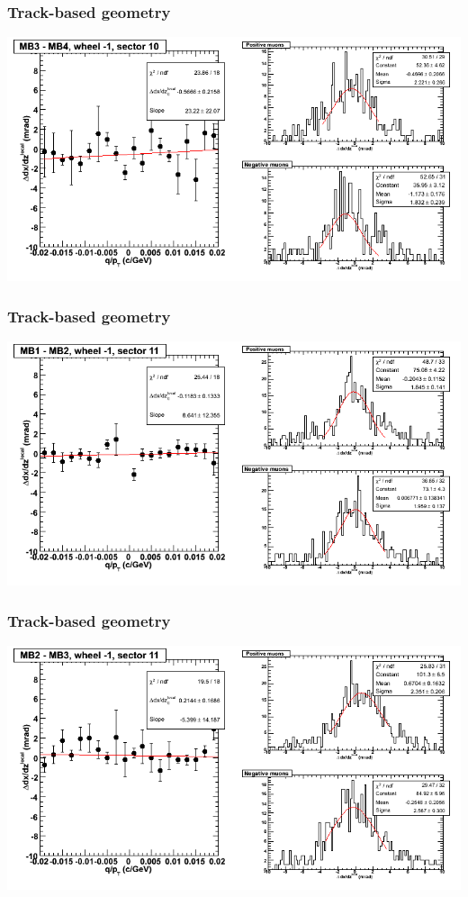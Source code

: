 \documentclass[compress]{beamer}
\begin{document}
\begin{frame}
\frametitle{Track-based geometry}
\includegraphics[width=\linewidth]{NOV4_segdiffs/dt13_slope_B_10_34.png}
\end{frame}

\begin{frame}
\frametitle{Track-based geometry}
\includegraphics[width=\linewidth]{NOV4_segdiffs/dt13_slope_B_11_12.png}
\end{frame}

\begin{frame}
\frametitle{Track-based geometry}
\includegraphics[width=\linewidth]{NOV4_segdiffs/dt13_slope_B_11_23.png}
\end{frame}
\end{document}
